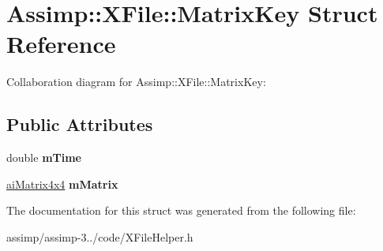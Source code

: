 \hypertarget{struct_assimp_1_1_x_file_1_1_matrix_key}{\section{Assimp\+:\+:X\+File\+:\+:Matrix\+Key Struct Reference}
\label{struct_assimp_1_1_x_file_1_1_matrix_key}
}


Collaboration diagram for Assimp\+:\+:X\+File\+:\+:Matrix\+Key\+:
\subsection*{Public Attributes}
\begin{DoxyCompactItemize}
\item 
\hypertarget{struct_assimp_1_1_x_file_1_1_matrix_key_a7a8d74377e54091003695c294bd34dc3}{double {\bfseries m\+Time}}\label{struct_assimp_1_1_x_file_1_1_matrix_key_a7a8d74377e54091003695c294bd34dc3}

\item 
\hypertarget{struct_assimp_1_1_x_file_1_1_matrix_key_a10ede0aebef932a011a7759910f29ff6}{\hyperlink{structai_matrix4x4}{ai\+Matrix4x4} {\bfseries m\+Matrix}}\label{struct_assimp_1_1_x_file_1_1_matrix_key_a10ede0aebef932a011a7759910f29ff6}

\end{DoxyCompactItemize}


The documentation for this struct was generated from the following file\+:\begin{DoxyCompactItemize}
\item 
assimp/assimp-\/3../code/X\+File\+Helper.\+h\end{DoxyCompactItemize}
